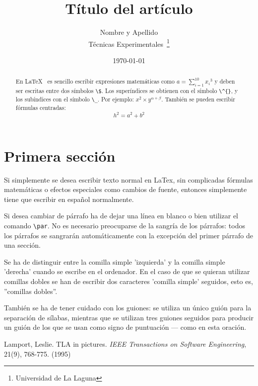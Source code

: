 \documentclass[a4paper,12pt]{article}
\begin{document}
\title{Título del artículo}
\author{Nombre y Apellido \\
        Técnicas Experimentales~\footnote{Universidad de La Laguna}
       }
\date{\today}
\maketitle
\begin{abstract}
  En \LaTeX{}~\cite{Lam:86} es sencillo escribir expresiones
  matemáticas como $a=\sum_{i=1}^{10} {x_i}^{3}$
  y deben ser escritas entre dos símbolos \verb|\$|.
  Los superíndices se obtienen con el símbolo \verb|\^{}|, y
  los subíndices con el símbolo \verb|\_|.
  Por ejemplo: $x^2 \times y^{\alpha + \beta}$.
  También se pueden escribir fórmulas centradas:
  \[h^2=a^2 + b^2 \]
\end{abstract}

\section{Primera sección}
\par Si simplemente se desea escribir texto normal en LaTex,
sin complicadas f\'ormulas matem\'aticas o efectos especiales
como cambios de fuente, entonces simplemente tiene que escribir
en espa\~nol normalmente.
\par Si desea cambiar de p\'arrafo ha de dejar una l\'inea en blanco o bien
utilizar el comando \verb|\par|.
No es necesario preocuparse de la sangr\'ia de los p\'arrafos:
todos los p\'arrafos se sangrar\'an autom\'aticamente con la excepci\'on
del primer p\'arrafo de una secci\'on.

Se ha de distinguir entre la comilla simple 'izquierda'
y la comilla simple 'derecha' cuando se escribe en el ordenador.
En el caso de que se quieran utilizar comillas dobles se han de
escribir dos caracteres 'comilla simple' seguidos, esto es,
''comillas dobles''.

Tambi\'en se ha de tener cuidado con los guiones: se utiliza un \'unico
gui\'on para la separaci\'on de s\'ilabas, mientras que se utilizan
tres guiones seguidos para producir un gui\'on de los que se usan
como signo de puntuaci\'on --- como en esta oraci\'on.
\begin{thebibliography}{00}
    Lamport, Leslie.
    TLA in pictures.
    \emph{IEEE Transactions on Software Engineering},
    21(9), 768-775.
    (1995)
\end{thebibliography}
\end{document}
